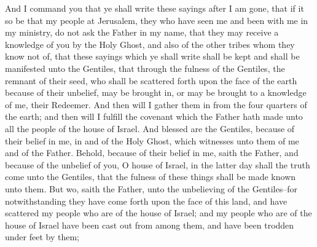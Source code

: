 And I command you that ye shall write these sayings after I am gone, that if it so be that my people at Jerusalem, they who have seen me and been with me in my ministry, do not ask the Father in my name, that they may receive a knowledge of you by the Holy Ghost, and also of the other tribes whom they know not of, that these sayings which ye shall write shall be kept and shall be manifested unto the Gentiles, that through the fulness of the Gentiles, the remnant of their seed, who shall be scattered forth upon the face of the earth because of their unbelief, may be brought in, or may be brought to a knowledge of me, their Redeemer.
\bverse \iffalse And then will I gather them in from the four quarters of the earth; and then will I fulfill the covenant which the Father hath made unto all the people of the house of Israel. \fi
And then will I gather them in from the four quarters of the earth; and then will I fulfill the covenant which the Father hath made unto all the people of the house of Israel.
\bverse \iffalse And blessed are the Gentiles, because of their belief in me, in and of the Holy Ghost, which witnesses unto them of me and of the Father. \fi
And blessed are the Gentiles, because of their belief in me, in and of the Holy Ghost, which witnesses unto them of me and of the Father.
\bverse \iffalse Behold, because of their belief in me, saith the Father, and because of the unbelief of you, O house of Israel, in the latter day shall the truth come unto the Gentiles, that the fulness of these things shall be made known unto them. \fi
Behold, because of their belief in me, saith the Father, and because of the unbelief of you, O house of Israel, in the latter day shall the truth come unto the Gentiles, that the fulness of these things shall be made known unto them.
\bverse \iffalse But wo, saith the Father, unto the unbelieving of the Gentiles--for notwithstanding they have come forth upon the face of this land, and have scattered my people who are of the house of Israel; and my people who are of the house of Israel have been cast out from among them, and have been trodden under feet by them; \fi
But wo, saith the Father, unto the unbelieving of the Gentiles--for notwithstanding they have come forth upon the face of this land, and have scattered my people who are of the house of Israel; and my people who are of the house of Israel have been cast out from among them, and have been trodden under feet by them;
\bverse \iffalse And because of the mercies of the Father unto the Gentiles, and also the judgments of the Father upon my people who are of the house of Israel, verily, verily, I say unto you, that after all this, and I have caused my people who are of the house of Israel to be smitten, and to be afflicted, and to be slain, and to be cast out from among them, and to become hated by them, and to become a hiss and a byword among them-- \fi

